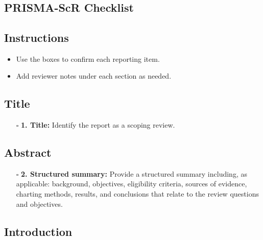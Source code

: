 \documentclass[11pt]{article}
\def\tightlist{}
\begin{document}
\begin{center}
{\LARGE }\\[4pt]
\normalsize 
\end{center}
\vspace{1em}

\begin{Form}

\section{PRISMA-ScR Checklist}\label{prisma-scr-checklist}

\subsection{Instructions}\label{instructions}

\begin{itemize}
\tightlist
\item
  Use the boxes to confirm each reporting item.
\item
  Add reviewer notes under each section as needed.
\end{itemize}

\subsection{Title}\label{title}

\begin{itemize}
\tightlist
\item[$\square$]
  \textbf{1. Title:} Identify the report as a scoping review.
\end{itemize}

\subsection{Abstract}\label{abstract}

\begin{itemize}
\tightlist
\item[$\square$]
  \textbf{2. Structured summary:} Provide a structured summary
  including, as applicable: background, objectives, eligibility
  criteria, sources of evidence, charting methods, results, and
  conclusions that relate to the review questions and objectives.
\end{itemize}

\subsection{Introduction}\label{introduction}


\end{Form}
\end{document}
